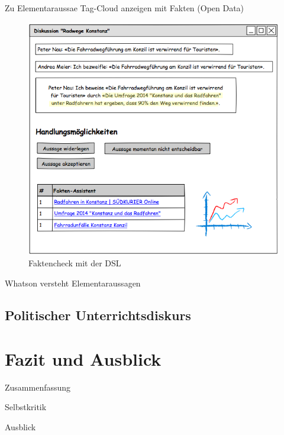 \documentclass[11pt,a4paper,bibtotocnumbered]{scrreprt}
\begin{document}
Zu Elementaraussae Tag-Cloud anzeigen mit Fakten (Open Data)

\begin{figure}[htbp]
\centering
\includegraphics[width=1\textwidth]{img/faktencheck.png}
\caption{Faktencheck mit der DSL}
\label{faktencheck}
\end{figure}

Whatson versteht Elementaraussagen

\section{Politischer Unterrichtsdiskurs} %



\chapter{Fazit und Ausblick} %


Zusammenfassung

Selbstkritik

Ausblick

 
\end{document}
